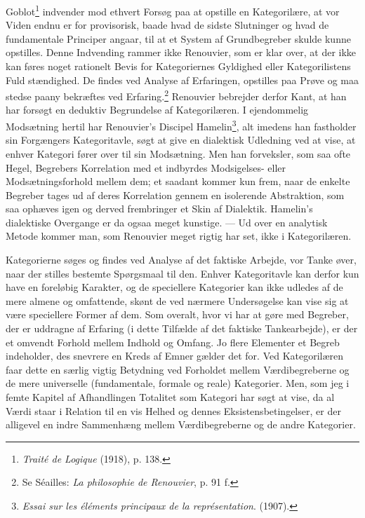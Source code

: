 \documentclass[12pt]{article}
\newcommand{\opage}[1]{\marginnote{\footnotesize\textit{[#1]}}}
\begin{document}
Goblot\footnote{\textit{Traité de Logique} (1918), p. 138.} indvender mod
ethvert Forsøg paa at opstille en Kategorilære, at vor Viden endnu er for
provisorisk, baade hvad de sidste Slutninger og hvad de fundamentale Principer
angaar, til at et System af Grundbegreber skulde kunne opstilles. Denne
Indvending rammer ikke Renouvier, som er klar over, at der ikke kan føres
noget rationelt Bevis for Kategoriernes Gyldighed eller Kategorilistens Fuld%
\opage{14}\setcounter{footnote}{0}%
stændighed. De findes ved Analyse af Erfaringen, opstilles paa Prøve og maa
stedse paany bekræftes ved Erfaring.\footnote{Se Séailles: \textit{La
philosophie de Renouvier}, p. 91 f.} Renouvier bebrejder derfor Kant, at han
har forsøgt en deduktiv Begrundelse af Kategorilæren. I ejendommelig
Modsætning hertil har Renouvier's Discipel
Hamelin\footnote{\textit{Essai sur les éléments principaux de la
représentation}. (1907).}, alt imedens han fastholder sin Forgængers
Kategoritavle, søgt at give en dialektisk Udledning ved at vise, at enhver
Kategori fører over til sin Modsætning. Men han forveksler, som saa ofte
Hegel, Begrebers Korrelation med et indbyrdes Modsigelses- eller
Modsætningsforhold mellem dem; et saadant kommer kun frem, naar de enkelte
Begreber tages ud af deres Korrelation gennem en isolerende Abstraktion, som
saa ophæves igen og derved frembringer et Skin af Dialektik. Hamelin's
dialektiske Overgange er da ogsaa meget kunstige. --- Ud over en analytisk
Metode kommer man, som Renouvier meget rigtig har set, ikke i Kategorilæren.

Kategorierne søges og findes ved Analyse af det faktiske Arbejde, vor Tanke
øver, naar der stilles bestemte Spørgsmaal til den. Enhver Kategoritavle kan
derfor kun have en foreløbig Karakter, og de speciellere Kategorier kan ikke
udledes af de mere almene og omfattende, skønt de ved nærmere Undersøgelse kan
vise sig at være speciellere Former af dem. Som overalt, hvor vi har at gøre
med Begreber, der er uddragne af Erfaring (i dette Tilfælde af det faktiske
Tankearbejde), er der et omvendt Forhold mellem Indhold og Omfang. Jo flere
Elementer et Begreb indeholder, des snevrere en Kreds af Emner gælder det for.
Ved Kategorilæren faar dette en særlig vigtig Betydning ved Forholdet mellem
Værdibegreberne og de mere
\opage{15} universelle (fundamentale, formale og reale) Kategorier. Men, som jeg i femte
Kapitel af Afhandlingen \guillemotright Totalitet som
Kategori\guillemotleft{} har søgt at vise, da al Værdi staar i Relation til en
vis Helhed og dennes Eksistensbetingelser, er der alligevel en indre
Sammenhæng mellem Værdibegreberne og de andre Kategorier.
\end{document}
